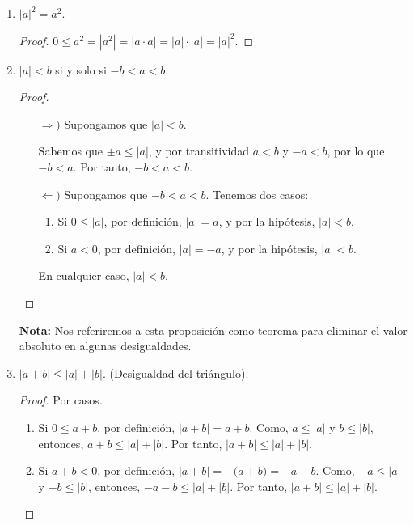 \documentclass[11pt]{article}
\begin{document}
\begin{enumerate}[label=\alph*)]
\item $|a|^2=a^2$.
\vspace{-1em}\begin{proof} 
    $0 \leq a^2 = |a^2|= |a\cdot a|=|a| \cdot |a|= |a|^2$. \qedhere
\end{proof} \vspace{-1em}

\item $|a|<b$ si y solo si $-b<a<b$.

\vspace{-1em}\begin{proof} \leavevmode
    \begin{itemize}
        \item[$\Rightarrow)$] Supongamos que $|a|<b$.
        
        Sabemos que $\pm a \leq |a|$, y por transitividad $a<b$ y $-a<b$, por lo que $-b<a$. Por tanto, $-b<a<b$.
        \item[$\Leftarrow)$] Supongamos que $-b<a<b$. Tenemos dos casos: \begin{enumerate}[label=\roman*)]
            \item Si $0\leq |a|$, por definición, $|a|=a$, y por la hipótesis, $|a|<b$.
            \item Si $a<0$, por definición, $|a|=-a$, y por la hipótesis, $|a|<b$.
        \end{enumerate} En cualquier caso, $|a|<b$. \qedhere 
    \end{itemize}
\end{proof} \vspace{-1em}

\textbf{Nota:} Nos referiremos a esta proposición como teorema para eliminar el valor absoluto en algunas desigualdades.

    \item $|a+b|\leq |a|+|b|$. (Desigualdad del triángulo).

    \vspace{-1em}\begin{proof} 
        Por casos.
        \begin{enumerate}[label=\roman*)]
            \item Si $0 \leq a+b$, por definición, $|a+b|=a+b$. Como, $a \leq |a|$ y $b \leq |b|$, entonces, $a+b \leq |a|+|b|$. Por tanto, $|a+b| \leq |a|+|b|$.
            \item Si $a+b<0$, por definición, $|a+b|=-\bigl(a+b\bigr)=-a-b$. Como, $-a \leq |a|$ y $-b \leq |b|$, entonces, $-a-b \leq |a|+|b|$. Por tanto, $|a+b| \leq |a|+|b|$. \qedhere
        \end{enumerate}    
    \end{proof} \vspace{-1em}
%


\end{enumerate}
\end{document}
